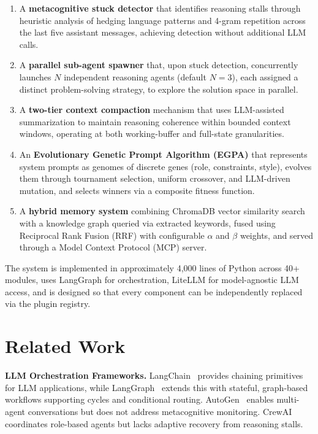 \documentclass[conference]{IEEEtran}
\begin{document}
\begin{enumerate}
    \item A \textbf{metacognitive stuck detector} that identifies reasoning stalls through heuristic analysis of hedging language patterns and 4-gram repetition across the last five assistant messages, achieving detection without additional LLM calls.
    \item A \textbf{parallel sub-agent spawner} that, upon stuck detection, concurrently launches $N$ independent reasoning agents (default $N{=}3$), each assigned a distinct problem-solving strategy, to explore the solution space in parallel.
    \item A \textbf{two-tier context compaction} mechanism that uses LLM-assisted summarization to maintain reasoning coherence within bounded context windows, operating at both working-buffer and full-state granularities.
    \item An \textbf{Evolutionary Genetic Prompt Algorithm (EGPA)} that represents system prompts as genomes of discrete genes (role, constraints, style), evolves them through tournament selection, uniform crossover, and LLM-driven mutation, and selects winners via a composite fitness function.
    \item A \textbf{hybrid memory system} combining ChromaDB vector similarity search with a knowledge graph queried via extracted keywords, fused using Reciprocal Rank Fusion (RRF) with configurable $\alpha$ and $\beta$ weights, and served through a Model Context Protocol (MCP) server.
\end{enumerate}

The system is implemented in approximately 4,000 lines of Python across 40+ modules, uses LangGraph for orchestration, LiteLLM for model-agnostic LLM access, and is designed so that every component can be independently replaced via the plugin registry.

\section{Related Work}
\label{sec:related}

\textbf{LLM Orchestration Frameworks.} LangChain~\cite{langchain2023} provides chaining primitives for LLM applications, while LangGraph~\cite{langgraph2024} extends this with stateful, graph-based workflows supporting cycles and conditional routing. AutoGen~\cite{wu2023autogen} enables multi-agent conversations but does not address metacognitive monitoring. CrewAI~\cite{crewai2024} coordinates role-based agents but lacks adaptive recovery from reasoning stalls.
\end{document}
